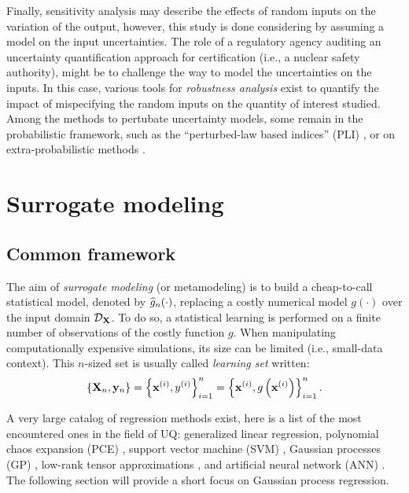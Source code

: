 Finally, sensitivity analysis may describe the effects of random inputs on the variation of the output, however, this study is done considering by assuming a model on the input uncertainties. 
The role of a regulatory agency auditing an uncertainty quantification approach for certification (i.e., a nuclear safety authority), might be to challenge the way to model the uncertainties on the inputs.  
In this case, various tools for \textit{robustness analysis} exist to quantify the impact of mispecifying the random inputs on the quantity of interest studied. 
Among the methods to pertubate uncertainty models, some remain in the probabilistic framework, such as the ``perturbed-law based indices'' (PLI) \citep{lemaitre_2015_PLI}, or on extra-probabilistic methods \citep{ajenjo_2022_structural_safety}. 




\section{Surrogate modeling} \label{sec:surrogate}

\subsection{Common framework}

The aim of \textit{surrogate modeling} (or metamodeling) is to build a cheap-to-call statistical model, 
denoted by $\widehat{g}_n(\cdot)$, replacing a costly numerical model $g(\cdot)$ over the input domain $\mathcal{D}_{{\bf X}}$. 
To do so, a statistical learning is performed on a finite number of observations of the costly function $g$. 
When manipulating computationally expensive simulations, its size can be limited (i.e., small-data context). 
This $n$-sized set is usually called \textit{learning set} written: 
\begin{equation}
    \left\{{\bf X}_n, {\bf y}_n\right\} = \left\{{\bf x}^{(i)}, y^{(i)}\right\}_{i=1}^n
                                = \left\{{\bf x}^{(i)}, g\left({\bf x}^{(i)}\right)\right\}_{i=1}^n.    
\end{equation}

A very large catalog of regression methods exist, here is a list of the most encountered ones in the field of UQ:
generalized linear regression, polynomial chaos expansion (PCE) \citep{soize_2004, blatman_2011}, support vector machine (SVM) \citep{vapnik_1995}, 
Gaussian processes (GP) \citep{rasmussen_2006}, low-rank tensor approximations \citep{grasedyck_2013}, and artificial neural network (ANN) \citep{tibshirani_2009}.
The following section will provide a short focus on Gaussian process regression. %

